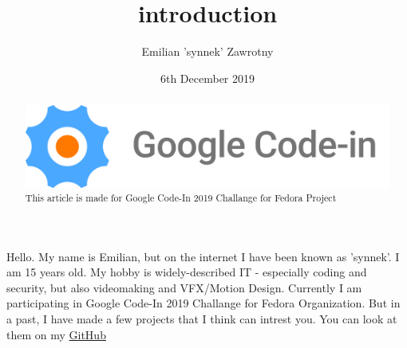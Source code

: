 \documentclass{article}
\title{introduction}
\author{Emilian 'synnek' Zawrotny}
\date{6th December 2019}
\begin{document}
\begin{abstract}
\includegraphics[scale=0.1]{./GCI-new-logo.jpg}
This article is made for Google Code-In 2019 Challange for Fedora Project

\end{abstract}
Hello. My name is Emilian, but on the internet I have been known as 'synnek'. I am 15 years old. My hobby is widely-described IT - especially coding and security, but also videomaking and VFX/Motion Design.
Currently I am participating in Google Code-In 2019 Challange for Fedora Organization. But in a past, I have made a few projects that I think can intrest you. You can look at them on my \href{https://github.com/synnek1337/}{GitHub}
\end{document}
